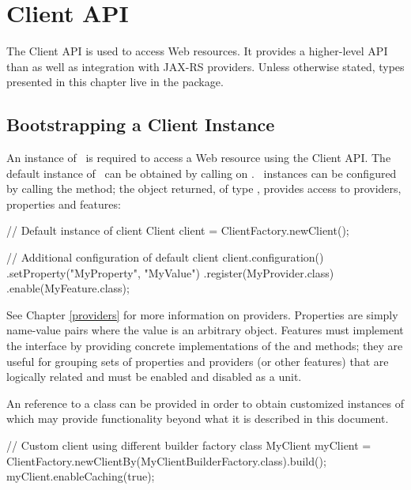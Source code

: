\chapter{Client API}
\label{client_api}

The Client API is used to access Web resources. It provides a higher-level API than  as well as integration with JAX-RS providers. Unless otherwise stated, types presented in this chapter live in the  package.

\section{Bootstrapping a Client Instance}

An instance of \Client\ is required to access a Web resource using the Client API. The default instance of \Client\ can be obtained by calling  on \ClientFactory. \Client\ instances can be configured by calling the  method; the object returned, of type , provides access to providers, properties and features:

\begin{listing}{1}
// Default instance of client
Client client = ClientFactory.newClient();

// Additional configuration of default client
client.configuration()
    .setProperty("MyProperty", "MyValue")
    .register(MyProvider.class)
    .enable(MyFeature.class);
\end{listing}

See Chapter \ref{providers} for more information on providers. Properties are simply name-value pairs where the value is an arbitrary object.  Features must implement the  interface by providing concrete implementations of the  and  methods; they are useful for grouping sets of properties and providers (or other features) that are logically related and must be enabled and disabled as a unit.

An reference to a  class can be provided in order to obtain customized instances of  which may provide functionality beyond what it is described in this document.  

\begin{listing}{1}
// Custom client using different builder factory class
MyClient myClient = 
    ClientFactory.newClientBy(MyClientBuilderFactory.class).build();
myClient.enableCaching(true);
\end{listing}

